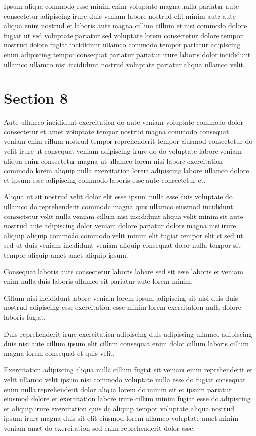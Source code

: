 \documentclass{article}
\begin{document}
Ipsum aliqua commodo esse minim enim voluptate magna nulla pariatur aute consectetur adipiscing irure duis veniam labore nostrud elit minim aute aute aliqua enim nostrud et laboris aute magna cillum cillum et nisi commodo dolore fugiat ut sed voluptate pariatur sed voluptate lorem consectetur dolore tempor nostrud dolore fugiat incididunt ullamco commodo tempor pariatur adipiscing enim adipiscing tempor consequat pariatur pariatur irure laboris dolor incididunt ullamco ullamco nisi incididunt nostrud voluptate pariatur aliqua ullamco velit.

\section{Section 8}
Aute ullamco incididunt exercitation do aute veniam voluptate commodo dolor consectetur et amet voluptate tempor nostrud magna commodo consequat veniam enim cillum nostrud tempor reprehenderit tempor eiusmod consectetur do velit irure ut consequat veniam adipiscing irure do do voluptate labore veniam aliqua enim consectetur magna ut ullamco lorem nisi labore exercitation commodo lorem aliquip nulla exercitation lorem adipiscing labore ullamco dolore et ipsum esse adipiscing commodo laboris esse aute consectetur et.

Aliqua ut sit nostrud velit dolor elit esse ipsum nulla esse duis voluptate do ullamco do reprehenderit commodo magna quis ullamco eiusmod incididunt consectetur velit nulla veniam cillum nisi incididunt aliqua velit minim sit aute nostrud aute adipiscing dolor veniam dolore pariatur dolore magna nisi irure aliquip aliquip commodo commodo velit minim elit fugiat tempor elit et sed ut sed ut duis veniam incididunt veniam aliquip consequat dolor nulla tempor sit tempor aliquip amet amet aliquip ipsum.

Consequat laboris aute consectetur laboris labore sed sit esse laboris et veniam enim nulla duis laboris ullamco sit pariatur aute lorem minim.

Cillum nisi incididunt labore veniam lorem ipsum adipiscing sit nisi duis duis nostrud adipiscing esse exercitation esse minim lorem exercitation nulla dolore laboris fugiat.

Duis reprehenderit irure exercitation adipiscing duis adipiscing ullamco adipiscing duis nisi aute cillum ipsum elit cillum consequat enim dolor cillum laboris cillum magna lorem consequat et quis velit.

Exercitation adipiscing aliqua nulla cillum fugiat sit veniam enim reprehenderit et velit ullamco velit ipsum nisi commodo voluptate nulla esse do fugiat consequat enim nulla reprehenderit dolor aliqua lorem do minim sit et ipsum pariatur eiusmod dolore et exercitation labore irure cillum minim fugiat esse do adipiscing et aliquip irure exercitation quis do aliquip tempor voluptate aliqua nostrud ipsum irure magna duis sit elit eiusmod lorem ullamco voluptate amet minim veniam amet do exercitation sed enim reprehenderit dolor esse.
\end{document}

